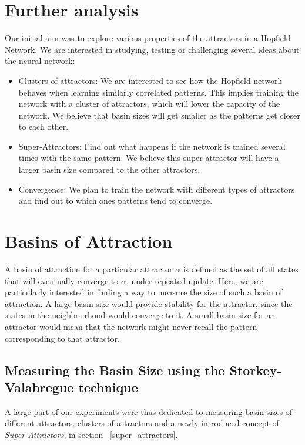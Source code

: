 \section{Further analysis}

Our initial aim was to explore various properties of the attractors in a Hopfield Network. We are interested in studying, testing or challenging several ideas about the neural network:
\begin{itemize}
 \item Clusters of attractors: We are interested to see how the Hopfield network behaves when learning similarly correlated patterns. This implies training the network with a cluster of attractors, which will lower the capacity of the network. We believe that basin sizes will get smaller as the patterns get closer to each other.
 \item Super-Attractors: Find out what happens if the network is trained several times with the same pattern. We believe this super-attractor will have a larger basin size compared to the other attractors.
 \item Convergence: We plan to train the network with different types of attractors and find out to which ones patterns tend to converge.
\end{itemize}

\section{Basins of Attraction}
A basin of attraction for a particular attractor \(\alpha\) is defined as the set of all states that will eventually converge to \(\alpha\), under repeated update. Here, we are particularly interested in finding a way to measure the size of such a basin of attraction. A large basin size would provide stability for the attractor, since the states in the neighbourhood would converge to it. A small basin size for an attractor would mean that the network might never recall the pattern corresponding to that attractor.

\subsection{Measuring the Basin Size using the Storkey-Valabregue technique}
\label{storkey_basin_size}

 A large part of our experiments were thus dedicated to measuring basin sizes of different attractors, clusters of attractors and a newly introduced concept of \emph{Super-Attractors}, in section ~\ref{super_attractors}.


